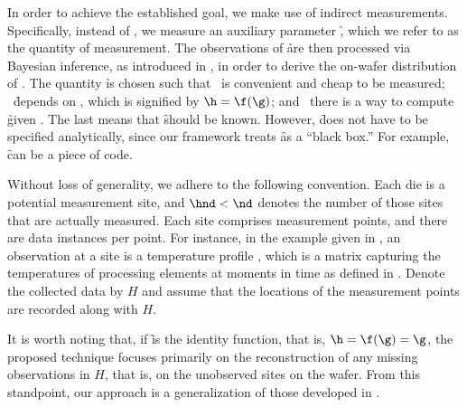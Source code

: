 In order to achieve the established goal, we make use of indirect measurements.
Specifically, instead of \g, we measure an auxiliary parameter \h, which we
refer to as the quantity of measurement. The observations of \h are then
processed via Bayesian inference, as introduced in ,
in order to derive the on-wafer distribution of \g. The quantity \h is chosen
such that \one~\h is convenient and cheap to be measured; \two~\h depends on \g,
which is signified by $\h = \f(\g)$; and \three~there is a way to compute \h
given \g. The last means that \f should be known. However, \f does not have to
be specified analytically, since our framework treats \f as a ``black box.'' For
example, \f can be a piece of code.

Without loss of generality, we adhere to the following convention. Each die is a
potential measurement site, and $\hnd < \nd$ denotes the number of those sites
that are actually measured. Each site comprises \np measurement points, and
there are \ns data instances per point. For instance, in the example given in
, an observation at a site is a temperature profile \mq,
which is a matrix capturing the temperatures of \np processing elements at \ns
moments in time as defined in . Denote the collected
data by $H$ and assume that the locations of the measurement points are recorded
along with $H$.

It is worth noting that, if \f is the identity function, that is, $\h = \f(\g) =
\g$, the proposed technique focuses primarily on the reconstruction of any
missing observations in $H$, that is, on the unobserved sites on the wafer. From
this standpoint, our approach is a generalization of those developed in
\cite{reda2009, zhang2010}.

